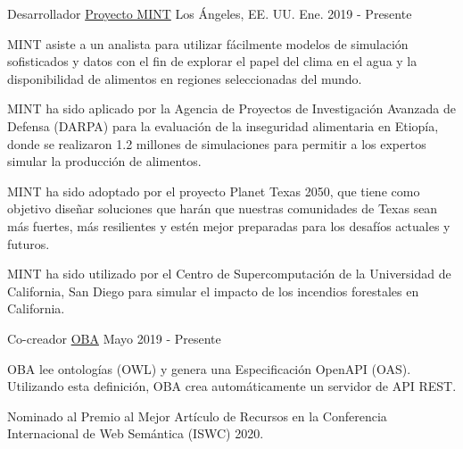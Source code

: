 \begin{cventries}
  \cventry
    {Desarrollador}
    {\href{https://mintproject.readthedocs.io/en/stable/}{Proyecto MINT}}
    {Los Ángeles, EE. UU.}
    {Ene. 2019 - Presente}
    {
      \begin{cvitems}
        \item {MINT asiste a un analista para utilizar fácilmente modelos de simulación sofisticados y datos con el fin de explorar el papel del clima en el agua y la disponibilidad de alimentos en regiones seleccionadas del mundo.}
        \item {MINT ha sido aplicado por la Agencia de Proyectos de Investigación Avanzada de Defensa (DARPA) para la evaluación de la inseguridad alimentaria en Etiopía, donde se realizaron 1.2 millones de simulaciones para permitir a los expertos simular la producción de alimentos.}
        \item {MINT ha sido adoptado por el proyecto Planet Texas 2050, que tiene como objetivo diseñar soluciones que harán que nuestras comunidades de Texas sean más fuertes, más resilientes y estén mejor preparadas para los desafíos actuales y futuros.}
        \item {MINT ha sido utilizado por el Centro de Supercomputación de la Universidad de California, San Diego para simular el impacto de los incendios forestales en California.}
      \end{cvitems}
    }
  \cventry
      {Co-creador}
      {\href{https://github.com/KnowledgeCaptureAndDiscovery/OBA}{OBA}}
      {}
      {Mayo 2019 - Presente}
      {
        \begin{cvitems}
          \item {OBA lee ontologías (OWL) y genera una Especificación OpenAPI (OAS). Utilizando esta definición, OBA crea automáticamente un servidor de API REST.}
          \item {Nominado al Premio al Mejor Artículo de Recursos en la Conferencia Internacional de Web Semántica (ISWC) 2020.}
        \end{cvitems}
      }
\end{cventries}